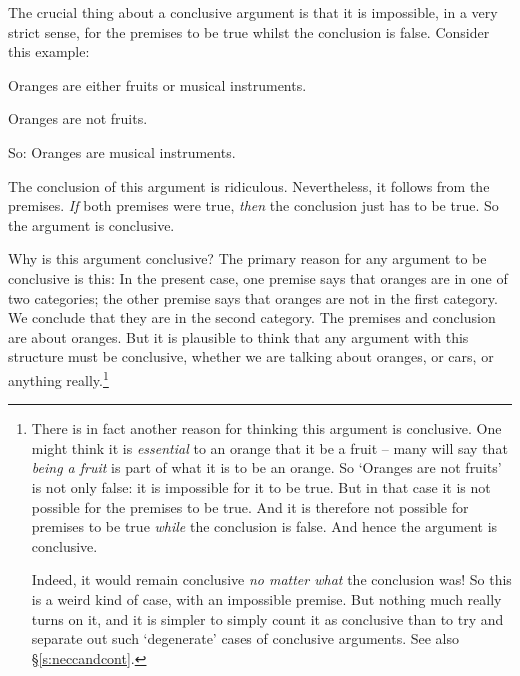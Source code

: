 The crucial thing about a conclusive argument is that it is impossible, in a very strict sense, for the premises to be true whilst the conclusion is false. Consider this example:
	\begin{earg}
		\item[] Oranges are either fruits or musical instruments.
		\item[] Oranges are not fruits.
		\item[So:] Oranges are musical instruments.
	\end{earg}
The conclusion of this argument is ridiculous. Nevertheless, it follows from the premises. \emph{If} both premises were true, \emph{then} the conclusion just has to be true. So the argument is conclusive.

Why is this argument conclusive? The primary reason for any argument to be conclusive is this:
 In the present case, one premise says that oranges are in one of two categories; the other premise says that oranges are not in the first category. We conclude that they are in the second category. The premises and conclusion are about oranges. But it is plausible to think that any argument with this structure must be conclusive, whether we are talking about oranges, or cars, or anything really.\footnote{There is in fact another reason for thinking this argument is conclusive. One might think it is \emph{essential} to an orange that it be a fruit – many will say that \emph{being a fruit} is part of what it is to be an orange. So `Oranges are not fruits' is not only false: it is impossible for it to be true. But in that case it is not possible for the premises to be true. And it is therefore not possible for premises to be true \emph{while} the conclusion is false. And hence the argument is conclusive. 

Indeed, it would remain conclusive \emph{no matter what} the conclusion was! So this is a weird kind of case, with an impossible premise. But nothing much really turns on it, and it is simpler to simply count it as conclusive than to try and separate out such `degenerate' cases of conclusive arguments. See also §\ref{s:neccandcont}.}


